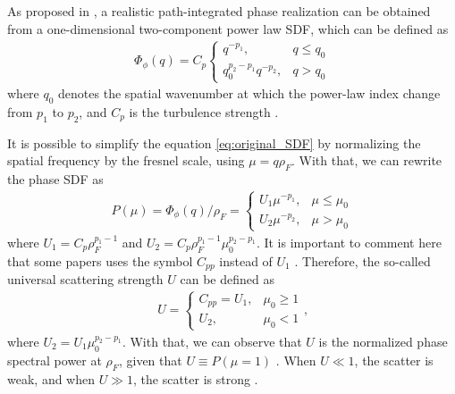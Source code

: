 As proposed in \cite{rinoCompactMultifrequencyGNSS2018}, a realistic path-integrated phase realization can be obtained from a one-dimensional two-component power law SDF, which can be defined as
\begin{align}
    \label{eq:original_SDF}
    \Phi_{\phi}\left( q \right) = C_p 
    \begin{cases} 
        q^{-p_1}, & q \leq q_0 \\ 
        q_0^{p_2 - p_1} q^{-p_2}, & q > q_0
    \end{cases}
\end{align}
where $q_0$ denotes the spatial wavenumber at which the power-law index change from $p_1$ to $p_2$, and $C_p$ is the turbulence strength \cite[Description below equation 5]{JiaoScintillationOnGPSSignalsForDynamicPlatforms2018}.

It is possible to simplify the equation \eqref{eq:original_SDF} by normalizing the spatial frequency by the fresnel scale, using $\mu = q \rho_F$. With that, we can rewrite the phase SDF as \cite[Equation 6]{JiaoScintillationOnGPSSignalsForDynamicPlatforms2018}
\begin{align}
    P\left( \mu \right) = \Phi_{\phi}\left( q \right) / \rho_F = 
    \begin{cases} 
        U_1 \mu^{-p_1}, & \mu \leq \mu_0 \\ 
        U_2 \mu^{-p_2}, & \mu > \mu_0
    \end{cases}
\end{align}
where $U_1 = C_p \rho_F^{p_1 - 1}$ and $U_2 = C_p \rho_F^{p_1 - 1} \mu_0^{p_2 - p_1}$. It is important to comment here that some papers uses the symbol $C_{pp}$ instead of $U_1$ \cite[Equation 21]{a rinoCompactMultifrequencyGNSS2018}. Therefore, the so-called universal scattering strength $U$ can be defined as \cite[Equation 7]{JiaoScintillationOnGPSSignalsForDynamicPlatforms2018}
\begin{align}
    U =
    \begin{cases}
        C_{pp} = U_1, & \mu_0 \geq 1 \\
        U_2, & \mu_0 < 1
    \end{cases} \text{,}
\end{align}
where $U_2 = U_1 \mu_0^{p_2-p_1}$. With that, we can observe that $U$ is the normalized phase spectral power at $\rho_F$, given that $U \equiv P\left( \mu = 1 \right)$ \cite{Carrano2016OverviewOfTwoComponentPowerLaw}. When $U \ll 1$, the scatter is weak, and when $U \gg 1$, the scatter is strong \cite{Carrano2016OverviewOfTwoComponentPowerLaw}. 

